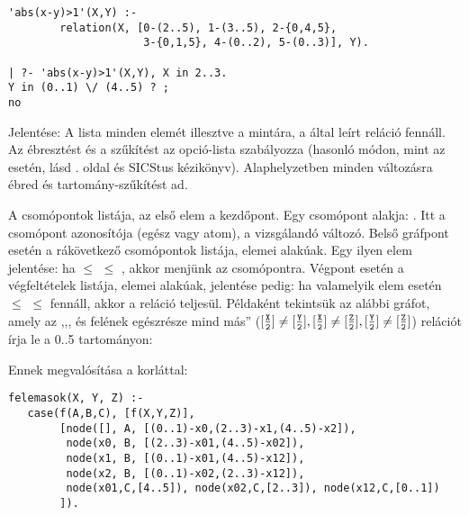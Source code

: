 \begin{verbatim}
'abs(x-y)>1'(X,Y) :-
        relation(X, [0-(2..5), 1-(3..5), 2-{0,4,5},
                     3-{0,1,5}, 4-(0..2), 5-(0..3)], Y).

| ?- 'abs(x-y)>1'(X,Y), X in 2..3.
Y in (0..1) \/ (4..5) ? ;
no
\end{verbatim}

\medskip
{}

Jelentése: A  lista minden elemét illesztve a 
mintára, a  által leírt reláció fennáll. Az ébresztést és a
szűkítést az  opció-lista szabályozza (hasonló módon, mint
az  esetén, lásd \pageref{all_distinct}. oldal és
SICStus kézikönyv). Alaphelyzetben minden változásra ébred és
tartomány-szűkítést ad.

A  csomópontok listája, az első elem a kezdőpont. Egy csomópont
alakja: . Itt  a csomópont azonosítója
(egész vagy atom),  a vizsgálandó változó. Belső gráfpont esetén
 a rákövetkező csomópontok listája, elemei 
alakúak. Egy ilyen elem jelentése: ha  $\leq$  $\leq$ ,
akkor menjünk az  csomópontra. Végpont esetén  a
végfeltételek listája, elemei  alakúak, jelentése pedig: ha
valamelyik elem esetén  $\leq$  $\leq$  fennáll, akkor
a reláció teljesül.
\br
Példaként tekintsük az alábbi gráfot, amely az ,,,  és 
felének egészrésze mind más'' (\([\frac{\texttt{X}}{\texttt{2}}]\neq[\frac{\texttt{Y}}{\texttt{2}}],
[\frac{\texttt{X}}{\texttt{2}}]\neq[\frac{\texttt{Z}}{\texttt{2}}],
[\frac{\texttt{Y}}{\texttt{2}}]\neq[\frac{\texttt{Z}}{\texttt{2}}]\)) relációt írja le a 0..5
tartományon:

\begin{center}\end{center}

Ennek megvalósítása a  korláttal:

\begin{verbatim}
felemasok(X, Y, Z) :-
   case(f(A,B,C), [f(X,Y,Z)],
        [node([], A, [(0..1)-x0,(2..3)-x1,(4..5)-x2]),
         node(x0, B, [(2..3)-x01,(4..5)-x02]),
         node(x1, B, [(0..1)-x01,(4..5)-x12]),
         node(x2, B, [(0..1)-x02,(2..3)-x12]),
         node(x01,C,[4..5]), node(x02,C,[2..3]), node(x12,C,[0..1])
        ]).
\end{verbatim}

